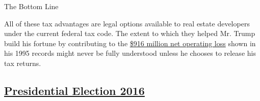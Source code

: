 The Bottom Line

All of these tax advantages are legal options available to real estate
developers under the current federal tax code. The extent to which they
helped Mr. Trump build his fortune by contributing to the
\href{http://documentcloud.org/documents/3117920-Pages-From-Donald-Trump-s-1995-Income-Tax-Returns.html}{\$916
million net operating loss} shown in his 1995 records might never be
fully understood unless he chooses to release his tax returns.

\hypertarget{presidential-election-2016}{%
\subsection{\texorpdfstring{\href{https://www.nytimes3xbfgragh.onion/news-event/election-2016}{Presidential
Election
2016}}{Presidential Election 2016}}\label{presidential-election-2016}}

